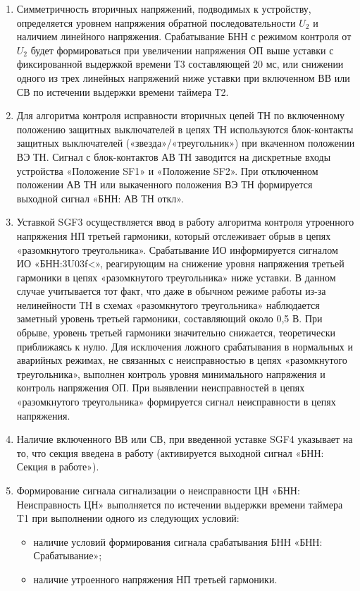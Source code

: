 \begin{enumerate}
\item
Симметричность вторичных напряжений, подводимых к устройству, определяется уровнем напряжения обратной последовательности $U_2$ и наличием линейного напряжения. Срабатывание БНН с режимом контроля от $U_2$ будет формироваться при увеличении напряжения ОП выше уставки с фиксированной выдержкой времени Т3 составляющей 20 мс, или снижении одного из трех линейных напряжений ниже уставки при включенном ВВ или СВ по истечении выдержки времени таймера Т2.

\item
Для алгоритма контроля исправности вторичных цепей ТН по включенному положению защитных выключателей в цепях ТН используются блок-контакты защитных выключателей («звезда»/«треугольник») при вкаченном положении ВЭ ТН. Сигнал с блок-контактов АВ ТН заводится на дискретные входы устройства «Положение SF1» и «Положение SF2». При отключенном положении АВ ТН или выкаченного положения ВЭ ТН формируется выходной сигнал «БНН: АВ ТН откл». 

\item
Уставкой SGF3 осуществляется ввод в работу алгоритма контроля утроенного напряжения НП третьей гармоники, который отслеживает обрыв в цепях «разомкнутого треугольника». Срабатывание ИО информируется сигналом ИО «БНН:3U03f<», реагирующим на снижение уровня напряжения третьей гармоники в цепях «разомкнутого треугольника» ниже уставки. В данном случае учитывается тот факт, что даже в обычном режиме работы из-за нелинейности ТН в схемах «разомкнутого треугольника» наблюдается заметный уровень третьей гармоники, составляющий около 0,5 В. При обрыве, уровень третьей гармоники значительно снижается, теоретически приближаясь к нулю. Для исключения ложного срабатывания в нормальных и аварийных режимах, не связанных с неисправностью в цепях «разомкнутого треугольника», выполнен контроль уровня минимального напряжения и контроль напряжения ОП. При выявлении неисправностей в цепях «разомкнутого треугольника» формируется сигнал неисправности в цепях напряжения.

\item
Наличие включенного ВВ или СВ, при введенной уставке SGF4 указывает на то, что секция введена в работу (активируется выходной сигнал «БНН: Секция в работе»).

\item
Формирование сигнала сигнализации о неисправности ЦН «БНН: Неисправность ЦН» выполняется по истечении выдержки времени таймера T1 при выполнении одного из следующих условий:
\begin{itemize}
    \item наличие условий формирования сигнала срабатывания БНН «БНН: Срабатывание»;
    \item наличие утроенного напряжения НП третьей гармоники.
\end{itemize}


\end{enumerate}
